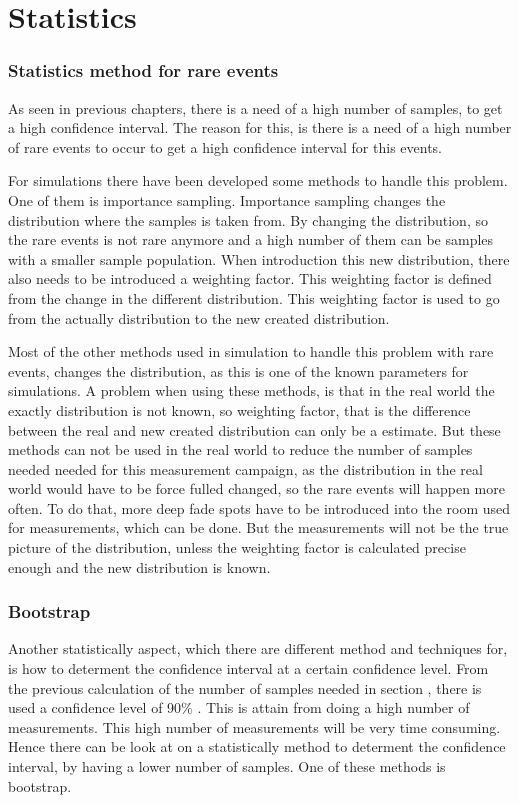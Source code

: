 \chapter{Statistics}

\subsection{Statistics method for rare events}
As seen in previous chapters, there is a need of a high number of samples, to get a high confidence interval. The reason for this, is there is a need of a high number of rare events to occur to get a high confidence interval for this events. 

For simulations there have been developed some methods to handle this problem. One of them is importance sampling. Importance sampling changes the distribution where the samples is taken from. By changing the distribution, so the rare events is not rare anymore and a high number of them can be samples with a smaller sample population. When introduction this new distribution, there also needs to be introduced a weighting factor. This weighting factor is defined from the change in the different distribution. This weighting factor is used to go from the actually distribution to the new created distribution.

Most of the other methods used in simulation to handle this problem with rare events, changes the distribution, as this is one of the known parameters for simulations. A problem when using these methods, is that in the real world the exactly distribution is not known, so weighting factor, that is the difference between the real and new created distribution can only be a estimate. But these methods can not be used in the real world to reduce the number of samples needed needed for this measurement campaign, as the distribution in the real world would have to be force fulled changed, so the rare events will happen more often. To do that, more deep fade spots have to be introduced into the room used for measurements, which can be done. But the measurements will not be the true picture of the distribution, unless the weighting factor is calculated precise enough and the new distribution is known.




\subsection{Bootstrap}
Another statistically aspect, which there are different method and techniques for, is how to determent the confidence interval at a certain confidence level. From the previous calculation of the number of samples needed in section , there is used a confidence level of 90\% . This is attain from doing a high number of measurements. This high number of measurements will be very time consuming. Hence there can be look at on a statistically method to determent the confidence interval, by having a lower number of samples. One of these methods is bootstrap.

